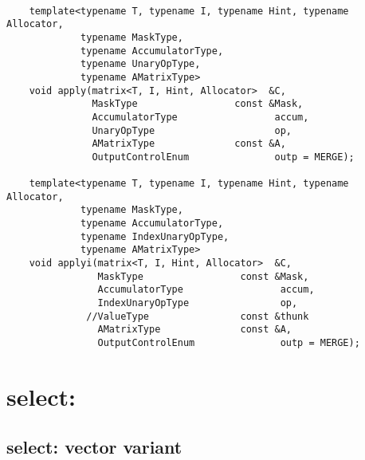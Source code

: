 \paragraph{\syntax}

\begin{verbatim}
    template<typename T, typename I, typename Hint, typename Allocator,
             typename MaskType,
             typename AccumulatorType,
             typename UnaryOpType,
             typename AMatrixType>
    void apply(matrix<T, I, Hint, Allocator>  &C,
               MaskType                 const &Mask,
               AccumulatorType                 accum,
               UnaryOpType                     op,
               AMatrixType              const &A,
               OutputControlEnum               outp = MERGE);

    template<typename T, typename I, typename Hint, typename Allocator,
             typename MaskType,
             typename AccumulatorType,
             typename IndexUnaryOpType,
             typename AMatrixType>
    void applyi(matrix<T, I, Hint, Allocator>  &C,
                MaskType                 const &Mask,
                AccumulatorType                 accum,
                IndexUnaryOpType                op,
              //ValueType                const &thunk
                AMatrixType              const &A,
                OutputControlEnum               outp = MERGE);
\end{verbatim}


\section{{\sf select}: }


\subsection{{\sf select}: vector variant}

\paragraph{\syntax}

